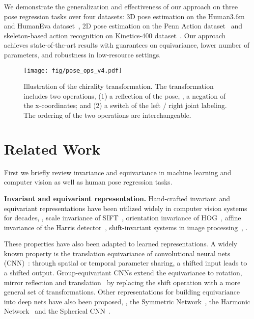 \documentclass{article}
\begin{document}
We demonstrate the generalization and effectiveness of our approach on three pose regression tasks over four datasets: 3D pose estimation on the Human3.6m~\cite{h36m_pami} and HumanEva dataset~\cite{sigal2010humaneva}, 2D pose estimation on the Penn Action dataset~\cite{zhang2013actemes} and skeleton-based action recognition on Kinetics-400 dataset~\cite{kay2017kinetics}. Our approach achieves state-of-the-art results with guarantees on equivariance, lower number of parameters, and robustness in low-resource settings. 


 


\begin{figure}[t]
	\centering
	\texttt{[image: fig/pose\_ops\_v4.pdf]}
	\vspace*{-0.2cm}
	\caption{
	Illustration of the chirality transformation. The transformation includes two operations, (1) a reflection of the pose, \ie, a negation of the x-coordinates; and (2) a switch of the left / right joint labeling. The ordering of the two operations are interchangeable. 
	}
	\label{fig:sym_prop}
	\vspace{-0.5cm}
\end{figure} 
\section{Related Work}
\label{sec:rel}
First we briefly review invariance and equivariance in machine learning and computer vision as well as human pose regression tasks.

\textbf{Invariant and equivariant representation.} 
Hand-crafted invariant and equivariant representations have been utilized widely in computer vision systems for decades, \eg, scale invariance of SIFT~\cite{lowe1999object}, orientation invariance of HOG~\cite{dalal2005histograms}, affine invariance of the Harris detector~\cite{mikolajczyk2004scale}, shift-invariant systems in image processing~\cite{vetterli2014foundations}, \etc.

These properties have also been adapted  to learned representations. A widely known property is the translation equivariance of convolutional neural nets (CNN)~\cite{lecun1999object}: through spatial or temporal parameter sharing, a shifted input leads to a shifted output. Group-equivariant CNNs extend the equivariance to rotation, mirror reflection and translation~\cite{cohen2016group} by replacing the shift operation with a more general set of transformations. Other representations for building equivariance into deep nets have also been proposed, \eg, the Symmetric Network~\cite{gens2014deep}, the Harmonic Network~\cite{worrall2017harmonic} and the Spherical CNN~\cite{cohen2018spherical}.
\end{document}
